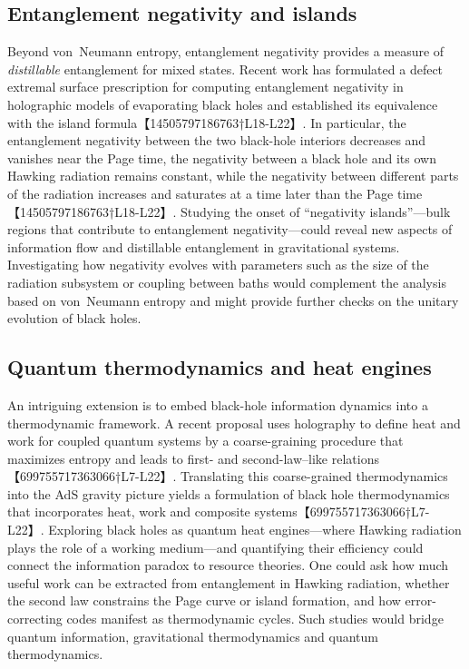 \documentclass[12pt]{article}
\begin{document}
\subsection{Entanglement negativity and islands}
Beyond von Neumann entropy, entanglement negativity provides a measure of \emph{distillable} entanglement for mixed states.  Recent work has formulated a defect extremal surface prescription for computing entanglement negativity in holographic models of evaporating black holes and established its equivalence with the island formula【14505797186763†L18-L22】.  In particular, the entanglement negativity between the two black-hole interiors decreases and vanishes near the Page time, the negativity between a black hole and its own Hawking radiation remains constant, while the negativity between different parts of the radiation increases and saturates at a time later than the Page time【14505797186763†L18-L22】.  Studying the onset of ``negativity islands''—bulk regions that contribute to entanglement negativity—could reveal new aspects of information flow and distillable entanglement in gravitational systems.  Investigating how negativity evolves with parameters such as the size of the radiation subsystem or coupling between baths would complement the analysis based on von Neumann entropy and might provide further checks on the unitary evolution of black holes.

\subsection{Quantum thermodynamics and heat engines}
An intriguing extension is to embed black-hole information dynamics into a thermodynamic framework.  A recent proposal uses holography to define heat and work for coupled quantum systems by a coarse-graining procedure that maximizes entropy and leads to first- and second-law–like relations【699755717363066†L7-L22】.  Translating this coarse-grained thermodynamics into the AdS gravity picture yields a formulation of black hole thermodynamics that incorporates heat, work and composite systems【699755717363066†L7-L22】.  Exploring black holes as quantum heat engines—where Hawking radiation plays the role of a working medium—and quantifying their efficiency could connect the information paradox to resource theories.  One could ask how much useful work can be extracted from entanglement in Hawking radiation, whether the second law constrains the Page curve or island formation, and how error-correcting codes manifest as thermodynamic cycles.  Such studies would bridge quantum information, gravitational thermodynamics and quantum thermodynamics.
\end{document}

